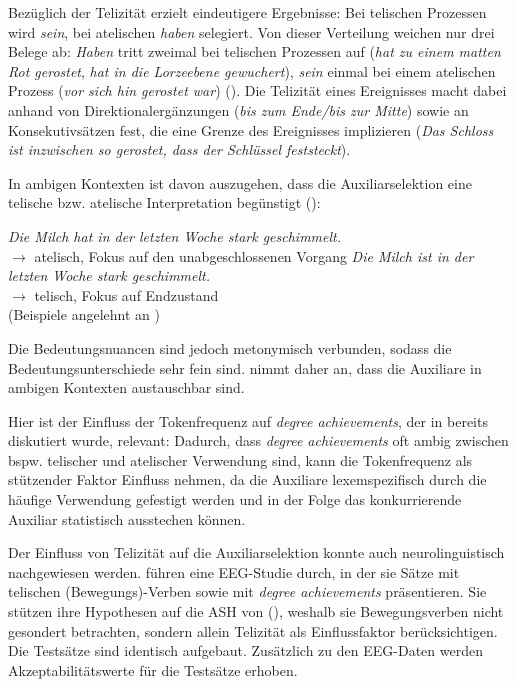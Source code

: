 Bezüglich der Telizität erzielt \textcite[259--262]{Gillmann.2016} eindeutigere Ergebnisse: Bei telischen Prozessen wird \textit{sein}, bei atelischen \textit{haben} selegiert. Von dieser Verteilung weichen nur drei Belege ab: \textit{Haben} tritt zweimal bei telischen Prozessen auf (\textit{hat zu einem matten Rot gerostet}, \textit{hat in die Lorzeebene gewuchert}), \textit{sein} einmal bei einem atelischen Prozess (\textit{vor sich hin gerostet war}) (\cite[261]{Gillmann.2016}). Die Telizität eines Ereignisses macht \textcite[259]{Gillmann.2016} dabei anhand von Direktionalergänzungen (\textit{bis zum Ende/bis zur Mitte}) sowie an Konsekutivsätzen fest, die eine Grenze des Ereignisses implizieren (\textit{Das Schloss ist inzwischen so gerostet, dass der Schlüssel feststeckt}).


In ambigen Kontexten ist davon auszugehen, dass die Auxiliarselektion eine telische bzw. atelische Interpretation begünstigt (\cite[260]{Gillmann.2016}): 

\begin{exe}
\ex \textit{Die Milch hat in der letzten Woche stark geschimmelt.} \\
$\rightarrow$ atelisch, Fokus auf den unabgeschlossenen Vorgang
\ex \textit{Die Milch ist in der letzten Woche stark geschimmelt.}\\
$\rightarrow$ telisch, Fokus auf Endzustand\\
(Beispiele angelehnt an \textcite[260]{Gillmann.2016})
\end{exe}

Die Bedeutungsnuancen sind jedoch metonymisch verbunden, sodass die Bedeutungsunterschiede sehr fein sind. \textcite[260]{Gillmann.2016} nimmt daher an, dass die Auxiliare in ambigen Kontexten austauschbar sind.\largerpage[2]

 
Hier ist der Einfluss der Tokenfrequenz auf \textit{degree achievements}, der in  bereits diskutiert wurde, relevant: Dadurch, dass \textit{degree achievements} oft ambig zwischen bspw. telischer und atelischer Verwendung sind, kann die Tokenfrequenz als stützender Faktor Einfluss nehmen, da die Auxiliare lexemspezifisch durch die häufige Verwendung gefestigt werden und in der Folge das konkurrierende Auxiliar statistisch ausstechen können.  

Der Einfluss von Telizität auf die Auxiliarselektion konnte auch neurolinguistisch nachgewiesen werden. \textcite{Roehm.2013} führen eine EEG-Studie durch, in der sie Sätze mit telischen (Bewegungs)-Verben sowie mit \textit{degree achievements} präsentieren. Sie stützen ihre Hypothesen auf die ASH von \textcite{Sorace.2000} (\cite[1246--1248]{Roehm.2013}), weshalb sie Bewegungsverben nicht gesondert betrachten, sondern allein Telizität als Einflussfaktor berücksichtigen. Die Testsätze sind identisch aufgebaut. Zusätzlich zu den EEG-Daten werden Akzeptabilitätswerte für die Testsätze erhoben.


